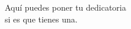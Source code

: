 
\thispagestyle{empty}
\vspace*{17mm}

\begin{flushright}
\begin{itshape}

Aquí puedes poner tu dedicatoria\\
si es que tienes una.\bigskip\bigskip

\end{itshape}
\end{flushright}

